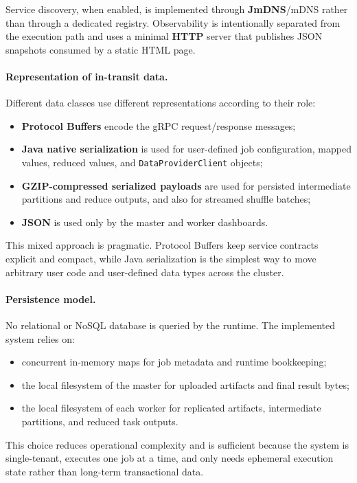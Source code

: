 \documentclass{scrartcl}
\begin{document}
Service discovery, when enabled, is implemented through \textbf{JmDNS}/mDNS rather than through a dedicated registry. Observability is intentionally separated from the execution path and uses a minimal \textbf{HTTP} server that publishes JSON snapshots consumed by a static HTML page.

\paragraph{Representation of in-transit data.}
Different data classes use different representations according to their role:
%
\begin{itemize}
    \item \textbf{Protocol Buffers} encode the gRPC request/response messages;
    \item \textbf{Java native serialization} is used for user-defined job configuration, mapped values, reduced values, and \texttt{DataProviderClient} objects;
    \item \textbf{GZIP-compressed serialized payloads} are used for persisted intermediate partitions and reduce outputs, and also for streamed shuffle batches;
    \item \textbf{JSON} is used only by the master and worker dashboards.
\end{itemize}

This mixed approach is pragmatic. Protocol Buffers keep service contracts explicit and compact, while Java serialization is the simplest way to move arbitrary user code and user-defined data types across the cluster.

\paragraph{Persistence model.}
No relational or NoSQL database is queried by the runtime. The implemented system relies on:
%
\begin{itemize}
    \item concurrent in-memory maps for job metadata and runtime bookkeeping;
    \item the local filesystem of the master for uploaded artifacts and final result bytes;
    \item the local filesystem of each worker for replicated artifacts, intermediate partitions, and reduced task outputs.
\end{itemize}

This choice reduces operational complexity and is sufficient because the system is single-tenant, executes one job at a time, and only needs ephemeral execution state rather than long-term transactional data.
\end{document}
